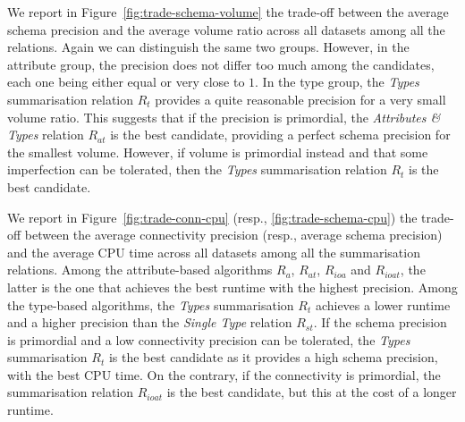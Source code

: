 We report in Figure~\ref{fig:trade-schema-volume} the trade-off between the average schema precision and the average volume ratio across all datasets among all the relations. Again we can distinguish the same two groups. However, in the attribute group, the precision does not differ too much among the candidates, each one being either equal or very close to $1$. In the type group, the \emph{Types} summarisation relation $R_t$ provides a quite reasonable precision for a very small volume ratio. This suggests that if the precision is primordial, the \emph{Attributes \& Types} relation $R_{at}$ is the best candidate, providing a perfect schema precision for the smallest volume. However, if volume is primordial instead and that some imperfection can be tolerated, then the \emph{Types} summarisation relation $R_t$ is the best candidate.

We report in Figure~\ref{fig:trade-conn-cpu} (resp., \ref{fig:trade-schema-cpu}) the trade-off between the average connectivity precision (resp., average schema precision) and the average CPU time across all datasets among all the summarisation relations. Among the attribute-based algorithms $R_a$, $R_{at}$, $R_{ioa}$ and $R_{ioat}$, the latter is the one that achieves the best runtime with the highest precision. Among the type-based algorithms, the \emph{Types} summarisation $R_t$ achieves a lower runtime and a higher precision than the \emph{Single Type} relation $R_{st}$.
If the schema precision is primordial and a low connectivity precision can be tolerated, the \emph{Types} summarisation $R_t$ is the best candidate as it provides a high schema precision, with the best CPU time. On the contrary, if the connectivity is primordial, the summarisation relation $R_{ioat}$ is the best candidate, but this at the cost of a longer runtime.

